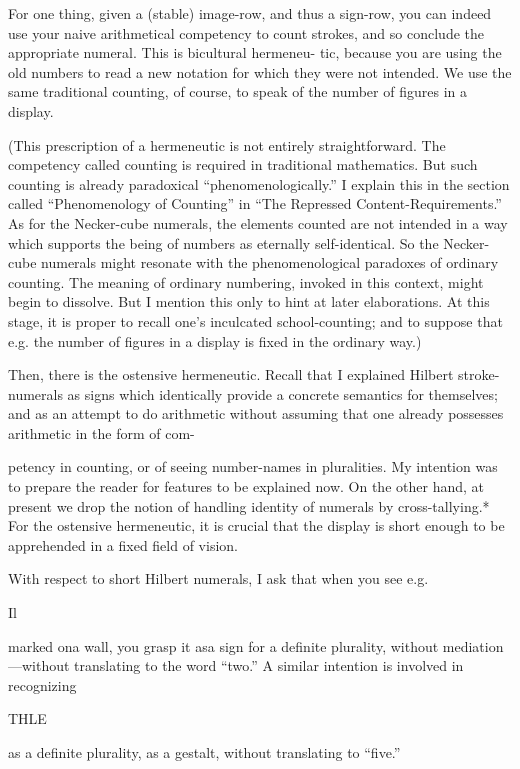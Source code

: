 For one thing, given a (stable) image-row, and thus a sign-row, you 
can indeed use your naive arithmetical competency to count strokes, 
and so conclude the appropriate numeral. This is bicultural hermeneu- 
tic, because you are using the old numbers to read a new notation for 
which they were not intended. We use the same traditional counting, of 
course, to speak of the number of figures in a display. 

(This prescription of a hermeneutic is not entirely straightforward. 
The competency called counting is required in traditional mathematics. 
But such counting is already paradoxical “phenomenologically.” I 
explain this in the section called “Phenomenology of Counting” in “The 
Repressed Content-Requirements.” As for the Necker-cube numerals, 
the elements counted are not intended in a way which supports the 
being of numbers as eternally self-identical. So the Necker-cube 
numerals might resonate with the phenomenological paradoxes of 
ordinary counting. The meaning of ordinary numbering, invoked in 
this context, might begin to dissolve. But I mention this only to hint at 
later elaborations. At this stage, it is proper to recall one’s inculcated 
school-counting; and to suppose that e.g. the number of figures in a 
display is fixed in the ordinary way.) 

Then, there is the ostensive hermeneutic. Recall that I explained 
Hilbert stroke-numerals as signs which identically provide a concrete 
semantics for themselves; and as an attempt to do arithmetic without 
assuming that one already possesses arithmetic in the form of com- 


petency in counting, or of seeing number-names in pluralities. My 
intention was to prepare the reader for features to be explained now. 
On the other hand, at present we drop the notion of handling identity of 
numerals by cross-tallying.* For the ostensive hermeneutic, it is crucial 
that the display is short enough to be apprehended in a fixed field of 
vision. 

With respect to short Hilbert numerals, I ask that when you see 
e.g. 

Il 


marked ona wall, you grasp it asa sign for a definite plurality, without 
mediation—without translating to the word “two.” A similar intention 
is involved in recognizing 


THLE 


as a definite plurality, as a gestalt, without translating to “five.” 

